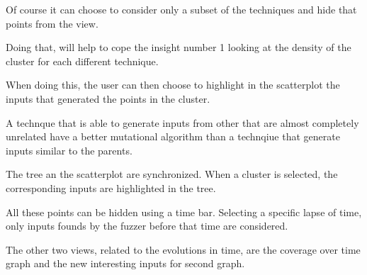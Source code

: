\documentclass[conference,compsoc]{IEEEtran}
\begin{document}
Of course it can choose to consider only a subset of the techniques and hide that points from the view.

Doing that, will help to cope the insight number 1 looking at the density of the cluster for each different technique.

When doing this, the user can then choose to highlight in the scatterplot the inputs that generated the points in the cluster.

A technque that is able to generate inputs from other that are almost completely unrelated have a better mutational algorithm than a technqiue that generate inputs similar to the parents.

The tree an the scatterplot are synchronized. When a cluster is selected, the corresponding inputs are highlighted in the tree.

All these points can be hidden using a time bar. Selecting a specific lapse of time, only inputs founds by the fuzzer before that time are considered.

The other two views, related to the evolutions in time, are the coverage over time graph and the new interesting inputs for second graph.



\end{document}
